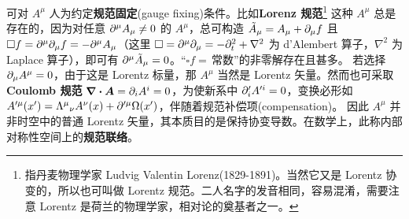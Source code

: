 可对 $A^\mu$ 人为约定\textbf{规范固定}(gauge fixing)条件。比如\textbf{Lorenz 规范}\footnote{指丹麦物理学家 Ludvig Valentin Lorenz(1829-1891)。当然它又是 Lorentz 协变的，所以也可叫做 Lorentz 规范。二人名字的发音相同，容易混淆，需要注意 Lorentz 是荷兰的物理学家，相对论的奠基者之一。}
这种 $A^\mu$ 总是存在的，因为对任意 $\partial^\mu A_\mu \ne 0$ 的 $A^\mu$，总可构造 $\tilde A_\mu = A_\mu + \partial_\mu f$ 且 $\square f=\partial^\mu\partial_\mu f=-\partial^\mu A_\mu $（这里 $\square=\partial^\mu\partial_\mu = -\partial_t^2 + \nabla^2$ 为 d'Alembert 算子，$\nabla^2$ 为 Laplace 算子），即可有 $\partial^\mu \tilde A_\mu =0$。“$\square f =$\,常数”的非零解存在且甚多。
若选择 $\partial_\mu A^\mu=0$，由于这是 Lorentz 标量，那 $A^\mu$ 当然是 Lorentz 矢量。然而也可采取\textbf{Coulomb 规范} $\div\bm A=\partial_iA^i=0$，为使新系中 $\partial'_iA'^i=0$，变换必形如 $A'^\mu(x') = \Lambda^\mu{}_\nu A^\nu(x) + \partial'^\mu\Omega(x')$，伴随着规范补偿项(compensation)。
因此 $A^\mu$ 并非时空中的普通 Lorentz 矢量，其本质目的是保持协变导数。在数学上，此称内部对称性空间上的\textbf{规范联络}。


